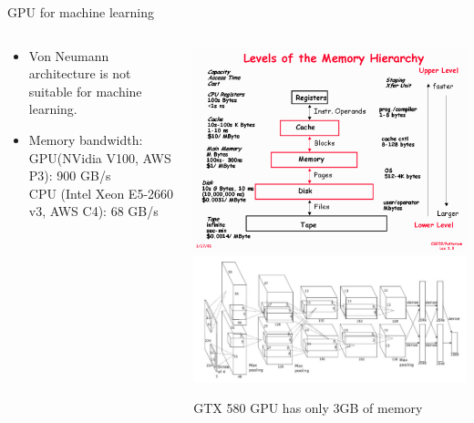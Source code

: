 \documentclass[14pt,aspectratio=1610]{beamer}
\begin{document}
\begin{frame}{GPU for machine learning}
\begin{columns}
\begin{column}[t]{0.6\linewidth}
\small
\begin{itemize}
\item Von Neumann architecture is not suitable for machine learning.
\item Memory bandwidth: \\
GPU(NVidia V100, AWS P3): 900 GB/s \\
CPU (Intel Xeon E5-2660 v3, AWS C4): 68 GB/s
\end{itemize}
\end{column}
\begin{column}[t]{0.38\linewidth}
\begin{center}
\includegraphics[width=\textwidth]{memory_hierarchy.png} \\
\includegraphics[width=\textwidth]{alexnet_architecture.png} \\
\end{center}
\tiny
GTX 580 GPU has only 3GB of memory
\end{column}
\end{columns}
\end{frame}
\end{document}
